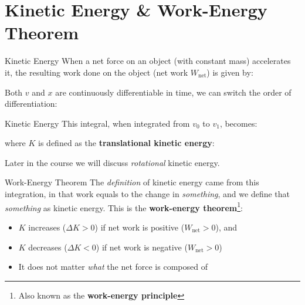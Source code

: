 \documentclass[12pt,compress,aspectratio=169]{beamer}
\begin{document}
\section{Kinetic Energy \& Work-Energy Theorem}

\begin{frame}{Kinetic Energy}
  When a net force on an object (with constant mass) accelerates it, the
  resulting work done on the object (net work $W_\text{net}$) is given by:


  Both $v$ and $x$ are continuously differentiable in time, we can switch the
  order of differentiation:
  
\end{frame}



\begin{frame}{Kinetic Energy}
  This integral, when integrated from $v_0$ to $v_1$, becomes:

  
  where $K$ is defined as the \textbf{translational kinetic energy}:


  Later in the course we will discuss \emph{rotational} kinetic energy.
\end{frame}



\begin{frame}{Work-Energy Theorem}
  The \emph{definition} of kinetic energy came from this integration, in that
  work equals to the change in \emph{something}, and we define that
  \emph{something} as kinetic energy. This is the
  \textbf{work-energy theorem}\footnote{Also known as the
  \textbf{work-energy principle}}:

  \begin{itemize}
  \item $K$ increases ($\Delta K>0$) if net work is positive ($W_\text{net}>0$),
    and
  \item $K$ decreases ($\Delta K<0$) if net work is negative ($W_\text{net}>0$)
  \item It does not matter \emph{what} the net force is composed of
  \end{itemize}
\end{frame}
\end{document}
